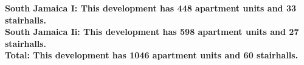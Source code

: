 \bf{South Jamaica I}: This development has 448 apartment units and 33 stairhalls.\\\bf{South Jamaica Ii}: This development has 598 apartment units and 27 stairhalls.\\\bf{Total}: This development has 1046 apartment units and 60 stairhalls.\\